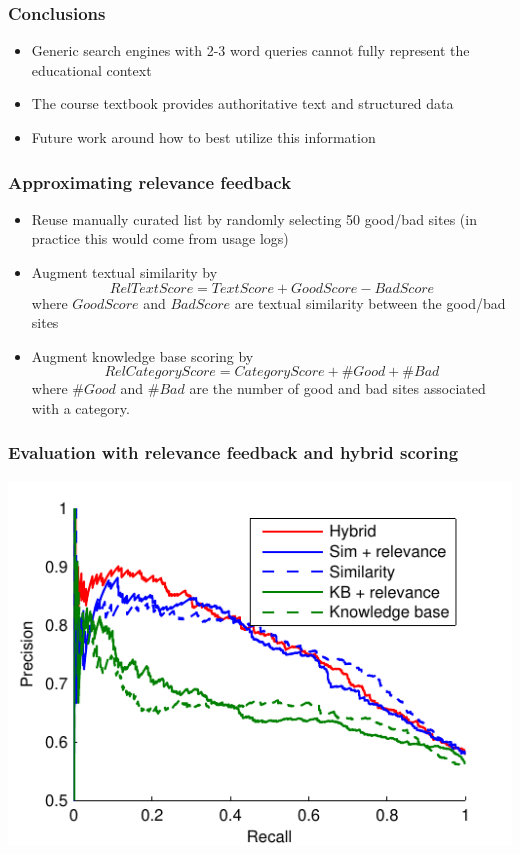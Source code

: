 \documentclass{beamer}
\begin{document}
\begin{frame}
\frametitle{Conclusions}
\begin{itemize}
\item Generic search engines with 2-3 word queries cannot fully represent the
  educational context
\item The course textbook provides authoritative text and structured data
\item Future work around how to best utilize this information
\end{itemize}
\end{frame}

\begin{frame}
\frametitle{Approximating relevance feedback}
\begin{itemize}
\item Reuse manually curated list by randomly selecting 50 good/bad sites (in
  practice this would come from usage logs)
\item Augment textual similarity by
\begin{equation}
RelTextScore = TextScore + GoodScore - BadScore
\end{equation}
where $GoodScore$ and $BadScore$ are textual similarity between the good/bad sites
\item Augment knowledge base scoring by
\begin{equation}
RelCategoryScore = CategoryScore + \#Good + \#Bad 
\end{equation}
where $\#Good$ and $\#Bad$ are the number of good and bad sites associated with
a category.
\end{itemize}
\end{frame}

\begin{frame}
\frametitle{Evaluation with relevance feedback and hybrid scoring}
\begin{center}
\includegraphics{expt_relevance}
\end{center}
\end{frame}
\end{document}
